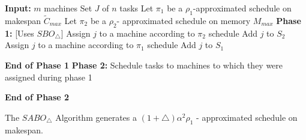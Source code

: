 \documentclass[twocolumn]{svjour3}
\begin{document}
\begin{algorithm}                    
  \caption{$SABO_\triangle$}
  \label{alg2}
  \begin{algorithmic} 
    \State \textbf{Input:} $m$ machines 
    \State \hspace*{42pt}Set $J$ of $n$ tasks
    \State\hspace*{42pt}Let $\pi_1$ be a $ \rho_1$-approximated schedule on makespan $\tilde{C}_{max}$ 
    \State \hspace*{42pt}Let $\pi_2$ be a $\rho_2$- approximated schedule on memory ${M_{max}}$
    \State
    \State \textbf{Phase 1:} [Uses $SBO_\triangle$]
    \State Assign $j$ to a machine according to $\pi_2$ schedule
    \State Add $j$ to $S_2$
    \Else
    \State Assign $j$ to a machine according to $\pi_1$ schedule
    \State Add $j$ to $S_1$   
    \EndIf 
    \EndFor
    
    \State \textbf{End of Phase 1} 
    \State 
    \State \textbf{Phase 2:} 
    \State \hspace*{42pt}Schedule tasks to machines to which they were assigned during phase 1
    
    \State \textbf{End of Phase 2} 
    
  \end{algorithmic}
\end{algorithm}     



\begin{theorem}
  \label{th:chapter5-2a}
  The $SABO_\triangle$ Algorithm generates a $(1+\triangle)\alpha^2
  \rho_1$ - approximated schedule on makespan.
\end{theorem}         
\end{document}
